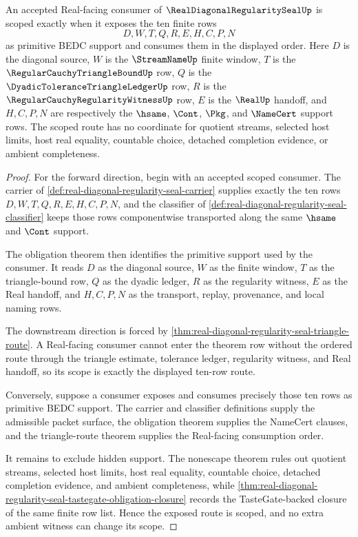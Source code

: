\begin{theorem}
\label{thm:real-diagonal-regularity-seal-scoped-consumer-route}
An accepted Real-facing consumer of $\RealDiagonalRegularitySealUp$ is scoped exactly when it exposes the ten finite rows
$$
D,W,T,Q,R,E,H,C,P,N
$$
as primitive BEDC support and consumes them in the displayed order. Here $D$ is the diagonal source, $W$ is the $\StreamNameUp$ finite window, $T$ is the $\RegularCauchyTriangleBoundUp$ row, $Q$ is the $\DyadicToleranceTriangleLedgerUp$ row, $R$ is the $\RegularCauchyRegularityWitnessUp$ row, $E$ is the $\RealUp$ handoff, and $H,C,P,N$ are respectively the $\hsame$, $\Cont$, $\Pkg$, and $\NameCert$ support rows. The scoped route has no coordinate for quotient streams, selected host limits, host real equality, countable choice, detached completion evidence, or ambient completeness.
\end{theorem}
\begin{proof}
For the forward direction, begin with an accepted scoped consumer. The carrier of \autoref{def:real-diagonal-regularity-seal-carrier} supplies exactly the ten rows $D,W,T,Q,R,E,H,C,P,N$, and the classifier of \autoref{def:real-diagonal-regularity-seal-classifier} keeps those rows componentwise transported along the same $\hsame$ and $\Cont$ support.

The obligation theorem then identifies the primitive support used by the consumer. It reads $D$ as the diagonal source, $W$ as the finite window, $T$ as the triangle-bound row, $Q$ as the dyadic ledger, $R$ as the regularity witness, $E$ as the Real handoff, and $H,C,P,N$ as the transport, replay, provenance, and local naming rows.

The downstream direction is forced by \autoref{thm:real-diagonal-regularity-seal-triangle-route}. A Real-facing consumer cannot enter the theorem row without the ordered route through the triangle estimate, tolerance ledger, regularity witness, and Real handoff, so its scope is exactly the displayed ten-row route.

Conversely, suppose a consumer exposes and consumes precisely those ten rows as primitive BEDC support. The carrier and classifier definitions supply the admissible packet surface, the obligation theorem supplies the NameCert clauses, and the triangle-route theorem supplies the Real-facing consumption order.

It remains to exclude hidden support. The nonescape theorem rules out quotient streams, selected host limits, host real equality, countable choice, detached completion evidence, and ambient completeness, while \autoref{thm:real-diagonal-regularity-seal-tastegate-obligation-closure} records the TasteGate-backed closure of the same finite row list. Hence the exposed route is scoped, and no extra ambient witness can change its scope.
\end{proof}

